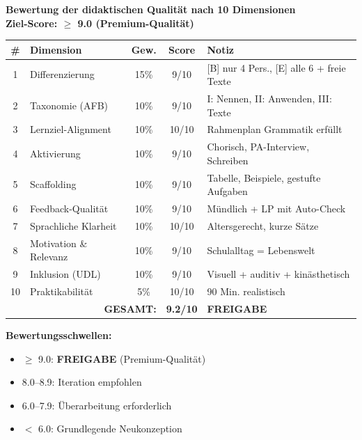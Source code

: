 \documentclass[11pt,a4paper]{article}
\begin{document}
\begin{scorebox}
\textbf{Bewertung der didaktischen Qualität nach 10 Dimensionen}\\
\textbf{Ziel-Score: $\geq$ 9.0 (Premium-Qualität)}

\vspace{1em}
\begin{tabular}{|c|l|c|c|p{4.5cm}|}
\hline
\textbf{\#} & \textbf{Dimension} & \textbf{Gew.} & \textbf{Score} & \textbf{Notiz} \\
\hline
1 & Differenzierung & 15\% & 9/10 & [B] nur 4 Pers., [E] alle 6 + freie Texte \\
\hline
2 & Taxonomie (AFB) & 10\% & 9/10 & I: Nennen, II: Anwenden, III: Texte \\
\hline
3 & Lernziel-Alignment & 10\% & 10/10 & Rahmenplan Grammatik erfüllt \\
\hline
4 & Aktivierung & 10\% & 9/10 & Chorisch, PA-Interview, Schreiben \\
\hline
5 & Scaffolding & 10\% & 9/10 & Tabelle, Beispiele, gestufte Aufgaben \\
\hline
6 & Feedback-Qualität & 10\% & 9/10 & Mündlich + LP mit Auto-Check \\
\hline
7 & Sprachliche Klarheit & 10\% & 10/10 & Altersgerecht, kurze Sätze \\
\hline
8 & Motivation \& Relevanz & 10\% & 9/10 & Schulalltag = Lebenswelt \\
\hline
9 & Inklusion (UDL) & 10\% & 9/10 & Visuell + auditiv + kinästhetisch \\
\hline
10 & Praktikabilität & 5\% & 10/10 & 90 Min. realistisch \\
\hline
\multicolumn{3}{|r|}{\textbf{GESAMT:}} & \textbf{9.2/10} & \textcolor{successgreen}{\textbf{FREIGABE}} \\
\hline
\end{tabular}

\vspace{1em}
\textbf{Bewertungsschwellen:}
\begin{itemize}
    \item[$\boxtimes$] \textcolor{successgreen}{$\geq$ 9.0: \textbf{FREIGABE} (Premium-Qualität)}
    \item[$\Box$] \textcolor{warningorange}{8.0--8.9: Iteration empfohlen}
    \item[$\Box$] 6.0--7.9: Überarbeitung erforderlich
    \item[$\Box$] $<$ 6.0: Grundlegende Neukonzeption
\end{itemize}
\end{scorebox}
\end{document}
